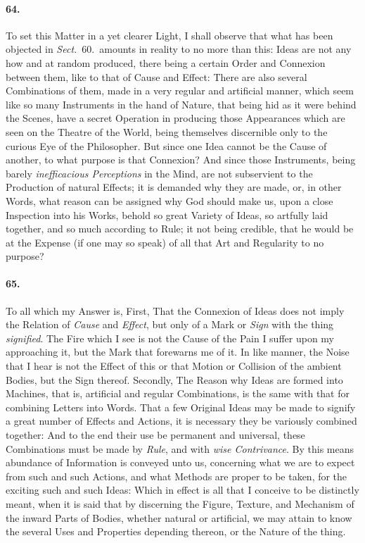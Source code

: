 \documentclass[]{article}
\newenvironment{sectionbody}{}{}
\begin{document}
\begin{sectionbody}
\paragraph{64.} To set this Matter in a yet clearer Light, I shall observe that
what has been objected in \emph{Sect.}~60.\ amounts in reality to
no more than this: Ideas are not any how
and at random produced, there being a certain Order and Connexion
between them, like to that of Cause and Effect: There are also
several Combinations of them, made in a very regular and
artificial manner, which seem like so many Instruments in the
hand of Nature, that being hid as it were behind the Scenes, have
a secret Operation in producing those Appearances which are seen
on the Theatre of the World, being themselves discernible only to
the curious Eye of the Philosopher.  But since one Idea cannot be
the Cause of another, to what purpose is that Connexion? And
since those Instruments, being barely \emph{inefficacious
Perceptions} in the Mind, are not subservient to the
Production of natural Effects; it is demanded why they are made,
or, in other Words, what reason can be assigned why God should
make us, upon a close Inspection into his Works, behold so great
Variety of Ideas, so artfully laid together, and so much
according to Rule; it not being credible, that he would be at the
Expense (if one may so speak) of all that Art and Regularity to
no purpose?



\paragraph{65.} To all which my Answer is, First, That the Connexion of Ideas
does not imply the Relation of \emph{Cause} and
\emph{Effect}, but only of a Mark or \emph{Sign} with the
thing \emph{signified}.  The Fire which I see is not the Cause
of the Pain I suffer upon my approaching it, but the Mark that
forewarns me of it.  In like manner, the Noise that I hear is not
the Effect of this or that Motion or Collision of the ambient
Bodies, but the Sign thereof.  Secondly, The Reason why Ideas are
formed into Machines, that is, artificial and regular
Combinations, is the same with that for combining Letters into
Words.  That a few Original Ideas may be made to signify a great
number of Effects and Actions, it is necessary they be variously
combined together: And to the end their use be permanent and
universal, these Combinations must be made by \emph{Rule}, and
with \emph{wise Contrivance}.  By this means abundance of
Information is conveyed unto us, concerning what we are to expect
from such and such Actions, and what Methods are proper to be
taken, for the exciting such and such Ideas: Which in effect is
all that I conceive to be distinctly meant, when it is said that
by discerning the Figure, Texture, and Mechanism of the inward
Parts of Bodies, whether natural or artificial, we may attain to
know the several Uses and Properties depending thereon, or the
Nature of the thing.




\end{sectionbody}
\end{document}
